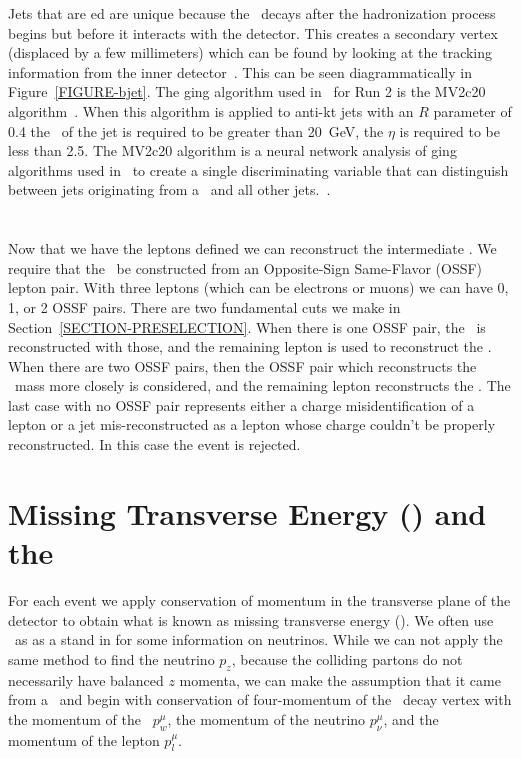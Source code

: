 Jets that are \btag ed are unique because the \ab~decays after the hadronization process begins but before it interacts with the detector. This creates a secondary vertex (displaced by a few millimeters) which can be found by looking at the tracking information from the inner detector~\cite{Coccaro:2011np}. This can be seen diagrammatically in Figure~\ref{FIGURE-bjet}. The \btag ging algorithm used in \atlas~for Run 2 is the MV2c20 algorithm~\cite{Hetherly:2032280}. When this algorithm is applied to anti-kt jets with an $R$ parameter of 0.4 the \PT~of the jet is required to be greater than 20~GeV, the $\eta$ is required to be less than 2.5. The MV2c20 algorithm is a neural network analysis of \btag ging algorithms used in \atlas~to create a single discriminating variable that can distinguish between jets originating from a \ab~and all other jets.~\cite{ATL-PHYS-PUB-2015-022}. 



\section{\az}
\label{SECTION-OBJ-Z}

Now that we have the leptons defined we can reconstruct the intermediate \az. We require that the \az~be constructed from an Opposite-Sign Same-Flavor (OSSF) lepton pair. With three leptons (which can be electrons or muons) we can have 0, 1, or 2 OSSF pairs. There are two fundamental cuts we make in Section~\ref{SECTION-PRESELECTION}. When there is one OSSF pair, the \az~is reconstructed with those, and the remaining lepton is used to reconstruct the \aw. When there are two OSSF pairs, then the OSSF pair which reconstructs the \azhyph~mass more closely is considered, and the remaining lepton reconstructs the \aw. The last case with no OSSF pair represents either a charge misidentification of a lepton or a jet mis-reconstructed as a lepton whose charge couldn't be properly reconstructed. In this case the event is rejected. 



\section{Missing Transverse Energy (\met ) and the \aw}
\label{SECTION-OBJ-MET}

For each event we apply conservation of momentum in the transverse plane of the detector to obtain what is known as missing transverse energy (\met). We often use \met~as as a stand in for some information on neutrinos. While we can not apply the same method to find the neutrino $p_z$, because the colliding partons do not necessarily have balanced $z$ momenta, we can make the assumption that it came from a \aw~and begin with conservation of four-momentum of the \aw~decay vertex with the momentum of the \aw~$p_{w}^{\mu}$, the momentum of the neutrino $p_{\nu}^{\mu}$, and the momentum of the lepton $p_{l}^{\mu}$. 


